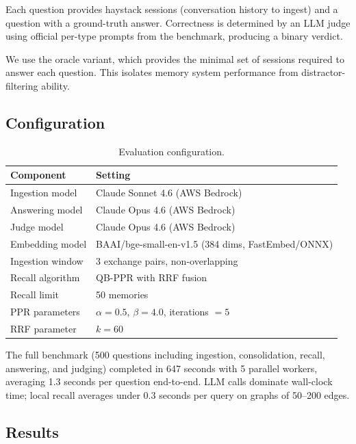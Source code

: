 \documentclass[11pt,a4paper]{article}
\begin{document}
Each question provides haystack sessions (conversation history to ingest) and a question with a ground-truth answer. Correctness is determined by an LLM judge using official per-type prompts from the benchmark, producing a binary verdict.

We use the oracle variant, which provides the minimal set of sessions required to answer each question. This isolates memory system performance from distractor-filtering ability.

\subsection{Configuration}

\begin{table}[h]
\centering
\caption{Evaluation configuration.}
\label{tab:config}
\begin{tabular}{@{}ll@{}}
\toprule
Component & Setting \\
\midrule
Ingestion model    & Claude Sonnet 4.6 (AWS Bedrock)                         \\
Answering model    & Claude Opus 4.6 (AWS Bedrock)                           \\
Judge model        & Claude Opus 4.6 (AWS Bedrock)                           \\
Embedding model    & BAAI/bge-small-en-v1.5 (384 dims, FastEmbed/ONNX)       \\
Ingestion window   & 3 exchange pairs, non-overlapping                       \\
Recall algorithm   & QB-PPR with RRF fusion                                  \\
Recall limit       & 50 memories                                             \\
PPR parameters     & $\alpha = 0.5$, $\beta = 4.0$, iterations $= 5$        \\
RRF parameter      & $k = 60$                                                \\
\bottomrule
\end{tabular}
\end{table}

The full benchmark (500 questions including ingestion, consolidation, recall, answering, and judging) completed in 647 seconds with 5 parallel workers, averaging 1.3 seconds per question end-to-end. LLM calls dominate wall-clock time; local recall averages under 0.3 seconds per query on graphs of 50--200 edges.

\subsection{Results}
\end{document}
